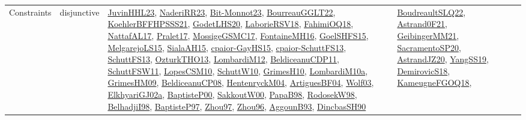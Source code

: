 {\begin{longtable}{lp{3cm}>{\raggedright}p{6cm}>{\raggedright}p{6cm}p{8cm}}
Constraints & disjunctive & \href{papers/JuvinHHL23.pdf}{JuvinHHL23}\cite{JuvinHHL23}, \href{articles/NaderiRR23.pdf}{NaderiRR23}\cite{NaderiRR23}, \href{papers/Bit-Monnot23.pdf}{Bit-Monnot23}\cite{Bit-Monnot23}, \href{articles/BourreauGGLT22.pdf}{BourreauGGLT22}\cite{BourreauGGLT22}, \href{articles/KoehlerBFFHPSSS21.pdf}{KoehlerBFFHPSSS21}\cite{KoehlerBFFHPSSS21}, \href{papers/GodetLHS20.pdf}{GodetLHS20}\cite{GodetLHS20}, \href{articles/LaborieRSV18.pdf}{LaborieRSV18}\cite{LaborieRSV18}, \href{articles/FahimiOQ18.pdf}{FahimiOQ18}\cite{FahimiOQ18}, \href{articles/NattafAL17.pdf}{NattafAL17}\cite{NattafAL17}, \href{papers/Pralet17.pdf}{Pralet17}\cite{Pralet17}, \href{papers/MossigeGSMC17.pdf}{MossigeGSMC17}\cite{MossigeGSMC17}, \href{papers/FontaineMH16.pdf}{FontaineMH16}\cite{FontaineMH16}, \href{articles/GoelSHFS15.pdf}{GoelSHFS15}\cite{GoelSHFS15}, \href{papers/MelgarejoLS15.pdf}{MelgarejoLS15}\cite{MelgarejoLS15}, \href{papers/SialaAH15.pdf}{SialaAH15}\cite{SialaAH15}, \href{papers/cpaior-GayHS15.pdf}{cpaior-GayHS15}\cite{cpaior-GayHS15}, \href{papers/cpaior-SchuttFS13.pdf}{cpaior-SchuttFS13}\cite{cpaior-SchuttFS13}, \href{papers/SchuttFS13.pdf}{SchuttFS13}\cite{SchuttFS13}, \href{articles/OzturkTHO13.pdf}{OzturkTHO13}\cite{OzturkTHO13}, \href{articles/LombardiM12.pdf}{LombardiM12}\cite{LombardiM12}, \href{articles/BeldiceanuCDP11.pdf}{BeldiceanuCDP11}\cite{BeldiceanuCDP11}, \href{articles/SchuttFSW11.pdf}{SchuttFSW11}\cite{SchuttFSW11}, \href{articles/LopesCSM10.pdf}{LopesCSM10}\cite{LopesCSM10}, \href{papers/SchuttW10.pdf}{SchuttW10}\cite{SchuttW10}, \href{papers/GrimesH10.pdf}{GrimesH10}\cite{GrimesH10}, \href{articles/LombardiM10a.pdf}{LombardiM10a}\cite{LombardiM10a}, \href{papers/GrimesHM09.pdf}{GrimesHM09}\cite{GrimesHM09}, \href{papers/BeldiceanuCP08.pdf}{BeldiceanuCP08}\cite{BeldiceanuCP08}, \href{papers/HentenryckM04.pdf}{HentenryckM04}\cite{HentenryckM04}, \href{papers/ArtiguesBF04.pdf}{ArtiguesBF04}\cite{ArtiguesBF04}, \href{papers/Wolf03.pdf}{Wolf03}\cite{Wolf03}, \href{papers/ElkhyariGJ02a.pdf}{ElkhyariGJ02a}\cite{ElkhyariGJ02a}, \href{articles/BaptisteP00.pdf}{BaptisteP00}\cite{BaptisteP00}, \href{articles/SakkoutW00.pdf}{SakkoutW00}\cite{SakkoutW00}, \href{articles/PapaB98.pdf}{PapaB98}\cite{PapaB98}, \href{papers/RodosekW98.pdf}{RodosekW98}\cite{RodosekW98}, \href{articles/BelhadjiI98.pdf}{BelhadjiI98}\cite{BelhadjiI98}, \href{papers/BaptisteP97.pdf}{BaptisteP97}\cite{BaptisteP97}, \href{articles/Zhou97.pdf}{Zhou97}\cite{Zhou97}, \href{papers/Zhou96.pdf}{Zhou96}\cite{Zhou96}, \href{articles/AggounB93.pdf}{AggounB93}\cite{AggounB93}, \href{articles/DincbasSH90.pdf}{DincbasSH90}\cite{DincbasSH90} & \href{papers/BoudreaultSLQ22.pdf}{BoudreaultSLQ22}\cite{BoudreaultSLQ22}, \href{papers/Astrand0F21.pdf}{Astrand0F21}\cite{Astrand0F21}, \href{papers/GeibingerMM21.pdf}{GeibingerMM21}\cite{GeibingerMM21}, \href{articles/SacramentoSP20.pdf}{SacramentoSP20}\cite{SacramentoSP20}, \href{articles/AstrandJZ20.pdf}{AstrandJZ20}\cite{AstrandJZ20}, \href{papers/YangSS19.pdf}{YangSS19}\cite{YangSS19}, \href{papers/DemirovicS18.pdf}{DemirovicS18}\cite{DemirovicS18}, \href{papers/KameugneFGOQ18.pdf}{KameugneFGOQ18}\cite{KameugneFGOQ18}, 
\end{longtable}}
